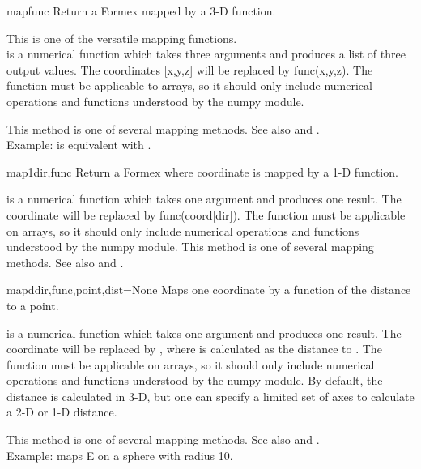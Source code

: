 \begin{methoddesc}{map}{func}
Return a Formex mapped by a 3-D function.

This is one of the versatile mapping functions.\\
 is a numerical function which takes three arguments and produces a list of three output values. The coordinates [x,y,z] will be replaced by func(x,y,z). The function must be applicable to arrays, so it should only include numerical operations and functions understood by the numpy module.

This method is one of several mapping methods. See also  and .\\
Example:  is equivalent with .
\end{methoddesc}

\begin{methoddesc}{map1}{dir,func}
Return a Formex where coordinate  is mapped by a 1-D function.

 is a numerical function which takes one argument and produces one result. The coordinate  will be replaced by func(coord[dir]). The function must be applicable on arrays, so it should only include numerical operations and functions understood by the numpy module. This method is one of several mapping methods. See also  and .
\end{methoddesc}

\begin{methoddesc}{mapd}{dir,func,point,dist=None}
Maps one coordinate by a function of the distance to a point.

 is a numerical function which takes one argument and produces one result. The coordinate  will be replaced by , where  is calculated as the distance to . The function must be applicable on arrays, so it should only include numerical operations and functions understood by the numpy module. By default, the distance  is calculated in 3-D, but one can specify a limited set of axes to calculate a 2-D or 1-D distance.

This method is one of several mapping methods. See also  and .\\
Example:  maps E on a sphere with radius 10.
\end{methoddesc}

